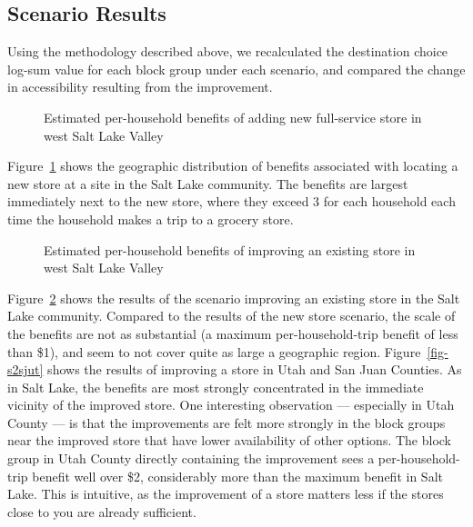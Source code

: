 \documentclass[
  letterpaper,
  number,
  review,
  doubleblind,
  3p]{elsarticle}
\begin{document}
\subsection{Scenario Results}\label{scenario-results}

Using the methodology described above, we recalculated the destination
choice log-sum value for each block group under each scenario, and
compared the change in accessibility resulting from the improvement.

\begin{figure}


\caption{\label{fig-s1results}Estimated per-household benefits of adding
new full-service store in west Salt Lake Valley}

\end{figure}%

Figure~\ref{fig-s1results} shows the geographic distribution of benefits
associated with locating a new store at a site in the Salt Lake
community. The benefits are largest immediately next to the new store,
where they exceed \(3\) for each household each time the household makes
a trip to a grocery store.

\begin{figure}


\caption{\label{fig-s2results}Estimated per-household benefits of
improving an existing store in west Salt Lake Valley}

\end{figure}%

Figure~\ref{fig-s2results} shows the results of the scenario improving
an existing store in the Salt Lake community. Compared to the results of
the new store scenario, the scale of the benefits are not as substantial
(a maximum per-household-trip benefit of less than \$1), and seem to not
cover quite as large a geographic region. Figure~\ref{fig-s2sjut} shows
the results of improving a store in Utah and San Juan Counties. As in
Salt Lake, the benefits are most strongly concentrated in the immediate
vicinity of the improved store. One interesting observation ---
especially in Utah County --- is that the improvements are felt more
strongly in the block groups near the improved store that have lower
availability of other options. The block group in Utah County directly
containing the improvement sees a per-household-trip benefit well over
\$2, considerably more than the maximum benefit in Salt Lake. This is
intuitive, as the improvement of a store matters less if the stores
close to you are already sufficient.
\end{document}
